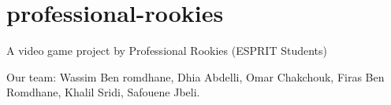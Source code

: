 \section*{professional-\/rookies}

A video game project by Professional Rookies (E\+S\+P\+R\+IT Students)

Our team\+: Wassim Ben romdhane, Dhia Abdelli, Omar Chakchouk, Firas Ben Romdhane, Khalil Sridi, Safouene Jbeli. 